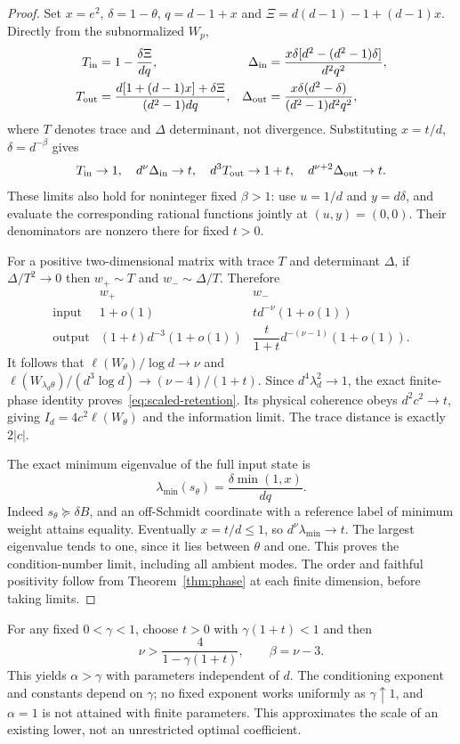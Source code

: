 \begin{proof}
Set $x=e^2$, $\delta=1-\theta$, $q=d-1+x$ and $\Xi=d(d-1)-1+(d-1)x$. Directly from the subnormalized $W_p$,
\begin{align*}
 T_{\rm in}&=1-\frac{\delta\Xi}{dq},&
 \Delta_{\rm in}&=\frac{x\delta[d^2-(d^2-1)\delta]}{d^2q^2},\\
 T_{\rm out}&=\frac{d[1+(d-1)x]+\delta\Xi}{(d^2-1)dq},&
 \Delta_{\rm out}&=\frac{x\delta(d^2-\delta)}{(d^2-1)d^2q^2},
\end{align*}
where $T$ denotes trace and $\Delta$ determinant, not divergence. Substituting $x=t/d$, $\delta=d^{-\beta}$ gives
\[
 T_{\rm in}\to1,\quad d^\nu\Delta_{\rm in}\to t,
 \quad d^3T_{\rm out}\to1+t,\quad d^{\nu+2}\Delta_{\rm out}\to t.
\]
These limits also hold for noninteger fixed $\beta>1$: use $u=1/d$ and $y=d\delta$, and evaluate the corresponding rational functions jointly at $(u,y)=(0,0)$. Their denominators are nonzero there for fixed $t>0$.

For a positive two-dimensional matrix with trace $T$ and determinant $\Delta$, if $\Delta/T^2\to0$ then $w_+\sim T$ and $w_-\sim\Delta/T$. Therefore
\[
 \begin{array}{c|cc}
 &w_+&w_-\\\hline
 \mathrm{input}&1+o(1)&t d^{-\nu}(1+o(1))\\
 \mathrm{output}&(1+t)d^{-3}(1+o(1))&
       \dfrac{t}{1+t}d^{-(\nu-1)}(1+o(1)).
 \end{array}
\]
It follows that $\ell(W_\theta)/\log d\to\nu$ and
$\ell(W_{\lambda_d\theta})/(d^3\log d)\to(\nu-4)/(1+t)$. Since $d^4\lambda_d^2\to1$, the exact finite-phase identity proves~\eqref{eq:scaled-retention}. Its physical coherence obeys $d^2c^2\to t$, giving $I_d=4c^2\ell(W_\theta)$ and the information limit. The trace distance is exactly $2|c|$.

The exact minimum eigenvalue of the full input state is
\[
 \lambda_{\min}(s_\theta)=\frac{\delta\min(1,x)}{dq}.
\]
Indeed $s_\theta\succeq\delta B$, and an off-Schmidt coordinate with a reference label of minimum weight attains equality. Eventually $x=t/d\le1$, so $d^\nu\lambda_{\min}\to t$. The largest eigenvalue tends to one, since it lies between $\theta$ and one. This proves the condition-number limit, including all ambient modes. The order and faithful positivity follow from Theorem~\ref{thm:phase} at each finite dimension, before taking limits.
\end{proof}

For any fixed $0<\gamma<1$, choose $t>0$ with $\gamma(1+t)<1$ and then
\[
 \nu>\frac4{1-\gamma(1+t)},\qquad\beta=\nu-3.
\]
This yields $\alpha>\gamma$ with parameters independent of $d$. The conditioning exponent and constants depend on $\gamma$; no fixed exponent works uniformly as $\gamma\uparrow1$, and $\alpha=1$ is not attained with finite parameters. This approximates the scale of an existing lower, not an unrestricted optimal coefficient.

